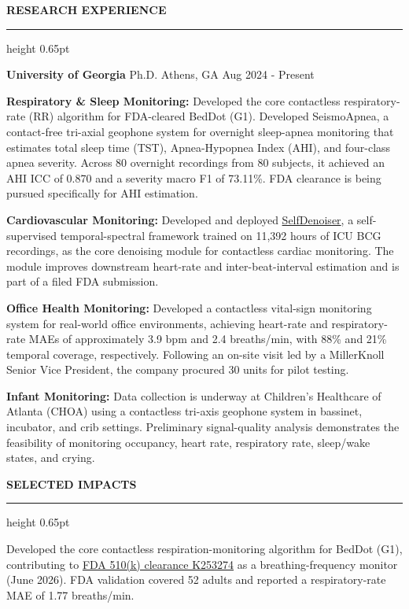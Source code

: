 \documentclass[10pt,letterpaper]{article}
\newcommand{\sectiontitle}[1]{%
  \vspace{0.72em}%
  {\fontsize{12}{13.3}\selectfont\bfseries\color{accent}\MakeUppercase{#1}}\par
  \vspace{0.16em}%
  {\color{accent}\hrule height 0.65pt}%
  \vspace{0.38em}%
}
\newcommand{\entryhead}[1]{%
  {\fontsize{10.25}{11.75}\selectfont #1}\par
  \vspace{0.12em}%
}
\newenvironment{tightitems}{%
  \begin{list}{\textbullet}{%
    \setlength{\leftmargin}{1.20em}%
    \setlength{\labelsep}{0.42em}%
    \setlength{\itemsep}{0.16em}%
    \setlength{\parsep}{0pt}%
    \setlength{\topsep}{0.16em}%
    \setlength{\partopsep}{0pt}%
  }%
  \fontsize{9.9}{11.65}\selectfont
}{\end{list}}
\begin{document}
\sectiontitle{Research Experience}
\entryhead{\textbf{University of Georgia} \textbar{} Ph.D. \textbar{} Athens, GA \textbar{} Aug 2024 - Present}
\begin{tightitems}
  \item \textbf{Respiratory \& Sleep Monitoring:} Developed the core contactless respiratory-rate (RR) algorithm for FDA-cleared BedDot (G1). Developed SeismoApnea, a contact-free tri-axial geophone system for overnight sleep-apnea monitoring that estimates total sleep time (TST), Apnea-Hypopnea Index (AHI), and four-class apnea severity. Across 80 overnight recordings from 80 subjects, it achieved an AHI ICC of 0.870 and a severity macro F1 of 73.11\%. FDA clearance is being pursued specifically for AHI estimation.
  \item \textbf{Cardiovascular Monitoring:} Developed and deployed \href{https://doi.org/10.1145/3770701}{SelfDenoiser}, a self-supervised temporal-spectral framework trained on 11,392 hours of ICU BCG recordings, as the core denoising module for contactless cardiac monitoring. The module improves downstream heart-rate and inter-beat-interval estimation and is part of a filed FDA submission.
  \item \textbf{Office Health Monitoring:} Developed a contactless vital-sign monitoring system for real-world office environments, achieving heart-rate and respiratory-rate MAEs of approximately 3.9 bpm and 2.4 breaths/min, with 88\% and 21\% temporal coverage, respectively. Following an on-site visit led by a MillerKnoll Senior Vice President, the company procured 30 units for pilot testing.
  \item \textbf{Infant Monitoring:} Data collection is underway at Children's Healthcare of Atlanta (CHOA) using a contactless tri-axis geophone system in bassinet, incubator, and crib settings. Preliminary signal-quality analysis demonstrates the feasibility of monitoring occupancy, heart rate, respiratory rate, sleep/wake states, and crying.
\end{tightitems}

\sectiontitle{Selected Impacts}
\begin{tightitems}
  \item Developed the core contactless respiration-monitoring algorithm for BedDot (G1), contributing to \href{https://www.accessdata.fda.gov/scripts/cdrh/cfdocs/cfpmn/pmn.cfm?ID=K253274}{FDA 510(k) clearance K253274} as a breathing-frequency monitor (June 2026). FDA validation covered 52 adults and reported a respiratory-rate MAE of 1.77 breaths/min.
\end{tightitems}
\end{document}
